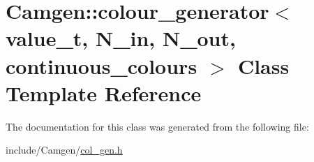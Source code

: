 \hypertarget{a00077}{}\section{Camgen\+:\+:colour\+\_\+generator$<$ value\+\_\+t, N\+\_\+in, N\+\_\+out, continuous\+\_\+colours $>$ Class Template Reference}
\label{a00077}


The documentation for this class was generated from the following file\+:\begin{DoxyCompactItemize}
\item 
include/\+Camgen/\hyperlink{a00612}{col\+\_\+gen.\+h}\end{DoxyCompactItemize}
